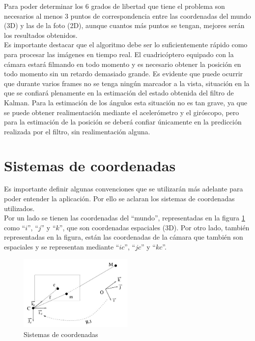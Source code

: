 \documentclass[main]{subfiles}
\begin{document}
Para poder determinar los 6 grados de libertad que tiene el problema son necesarios al menos 3 puntos de correspondencia entre las coordenadas del mundo (3D) y las de la foto (2D), aunque cuantos más puntos se tengan, mejores serán los resultados obtenidos.\\

Es importante destacar que el algoritmo debe ser lo suficientemente rápido como para procesar las imágenes en tiempo real. El cuadricóptero equipado con la cámara estará filmando en todo momento y es necesario obtener la posición en todo momento sin un retardo demasiado grande. Es evidente que puede ocurrir que durante varios frames no se tenga ningún marcador a la vista, situación en la que se confiará plenamente en la estimación del estado obtenida del filtro de Kalman. Para la estimación de los ángulos esta situación no es tan grave, ya que se puede obtener realimentación mediante el acelerómetro y el giróscopo, pero para la estimación de la posición se deberá confiar únicamente en la predicción realizada por el filtro, sin realimentación alguna.

\section{Sistemas de coordenadas}

Es importante definir algunas convenciones que se utilizarán más adelante para poder entender la aplicación. Por ello se aclaran los sistemas de coordenadas utilizados.\\

Por un lado se tienen las coordenadas del ``mundo'', representadas en la figura \ref{fig:coordenadas} como ``$i$'', ``$j$'' y ``$k$'', que son coordenadas espaciales (3D). Por otro lado, también representadas en la figura, están las coordenadas de la cámara que también son espaciales y se representan mediante ``$ic$'', ``$jc$'' y ``$kc$''.

\begin{figure}
	\begin{center}
		\includegraphics[width=0.5\textwidth]{./pics_camara/coordenadas.jpg}
	\end{center}
	\caption{Sistemas de coordenadas}
	\label{fig:coordenadas}
\end{figure}
\end{document}
